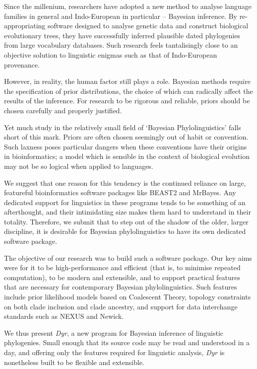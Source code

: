 \documentclass[10pt,journal,compsoc]{IEEEtran}
\begin{document}
Since the millenium, researchers have adopted a new method to analyse language families in general and Indo-European in particular -- Bayesian inference. By re-appropriating software designed to analyse genetic data and construct biological evolutionary trees, they have successfully inferred plausible dated phylogenies from large vocabulary databases. Such research feels tantalisingly close to an objective solution to linguistic enigmas such as that of Indo-European provenance.

However, in reality, the human factor still plays a role. Bayesian methods require the specification of prior distributions, the choice of which can radically affect the results of the inference. For research to be rigorous and reliable, priors should be chosen carefully and properly justified.

Yet much study in the relatively small field of `Bayesian Phylolinguistics' falls short of this mark. Priors are often chosen seemingly out of habit or convention. Such laxness poses particular dangers when these conventions have their origins in bioinformatics; a model which is sensible in the context of biological evolution may not be so logical when applied to languages.

We suggest that one reason for this tendency is the continued reliance on large, featureful bioinformatics software packages like BEAST2 and MrBayes. Any dedicated support for linguistics in these programs tends to be something of an afterthought, and their intimidating size makes them hard to understand in their totality. Therefore, we submit that to step out of the shadow of the older, larger discipline, it is desirable for Bayesian phylolinguistics to have its own dedicated software package.

The objective of our research was to build such a software package. Our key aims were for it to be high-performance and efficient (that is, to minimise repeated computation), to be modern and extensible, and to support practical features that are necessary for contemporary Bayesian phylolinguistics. Such features include prior likelihood models based on Coalescent Theory, topology constraints on both clade inclusion and clade ancestry, and support for data interchange standards such as NEXUS and Newick.

We thus present \textit{Dyr}, a new program for Bayesian inference of linguistic phylogenies. Small enough that its source code may be read and understood in a day, and offering only the features required for linguistic analysis, \textit{Dyr} is nonetheless built to be flexible and extensible. 
\end{document}
